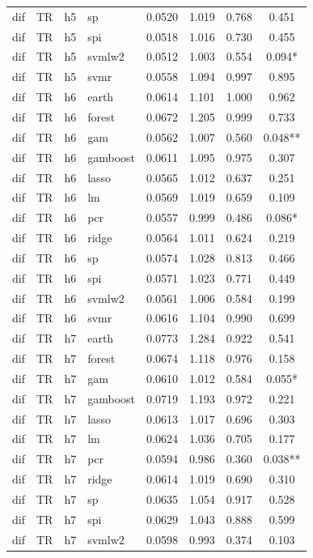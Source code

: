 \begin{ThreePartTable}
\begin{longtable}[t]{llclcccc}
dif & TR & h5 & sp & 0.0520 & 1.019 & 0.768 & 0.451\\
dif & TR & h5 & spi & 0.0518 & 1.016 & 0.730 & 0.455\\
dif & TR & h5 & svmlw2 & 0.0512 & 1.003 & 0.554 & 0.094*\\
dif & TR & h5 & svmr & 0.0558 & 1.094 & 0.997 & 0.895\\
\addlinespace
dif & TR & h6 & earth & 0.0614 & 1.101 & 1.000 & 0.962\\
dif & TR & h6 & forest & 0.0672 & 1.205 & 0.999 & 0.733\\
dif & TR & h6 & gam & 0.0562 & 1.007 & 0.560 & 0.048**\\
dif & TR & h6 & gamboost & 0.0611 & 1.095 & 0.975 & 0.307\\
dif & TR & h6 & lasso & 0.0565 & 1.012 & 0.637 & 0.251\\
dif & TR & h6 & lm & 0.0569 & 1.019 & 0.659 & 0.109\\
dif & TR & h6 & pcr & 0.0557 & 0.999 & 0.486 & 0.086*\\
dif & TR & h6 & ridge & 0.0564 & 1.011 & 0.624 & 0.219\\
dif & TR & h6 & sp & 0.0574 & 1.028 & 0.813 & 0.466\\
dif & TR & h6 & spi & 0.0571 & 1.023 & 0.771 & 0.449\\
dif & TR & h6 & svmlw2 & 0.0561 & 1.006 & 0.584 & 0.199\\
dif & TR & h6 & svmr & 0.0616 & 1.104 & 0.990 & 0.699\\
\addlinespace
dif & TR & h7 & earth & 0.0773 & 1.284 & 0.922 & 0.541\\
dif & TR & h7 & forest & 0.0674 & 1.118 & 0.976 & 0.158\\
dif & TR & h7 & gam & 0.0610 & 1.012 & 0.584 & 0.055*\\
dif & TR & h7 & gamboost & 0.0719 & 1.193 & 0.972 & 0.221\\
dif & TR & h7 & lasso & 0.0613 & 1.017 & 0.696 & 0.303\\
dif & TR & h7 & lm & 0.0624 & 1.036 & 0.705 & 0.177\\
dif & TR & h7 & pcr & 0.0594 & 0.986 & 0.360 & 0.038**\\
dif & TR & h7 & ridge & 0.0614 & 1.019 & 0.690 & 0.310\\
dif & TR & h7 & sp & 0.0635 & 1.054 & 0.917 & 0.528\\
dif & TR & h7 & spi & 0.0629 & 1.043 & 0.888 & 0.599\\
dif & TR & h7 & svmlw2 & 0.0598 & 0.993 & 0.374 & 0.103\\

\end{longtable}
\end{ThreePartTable}
